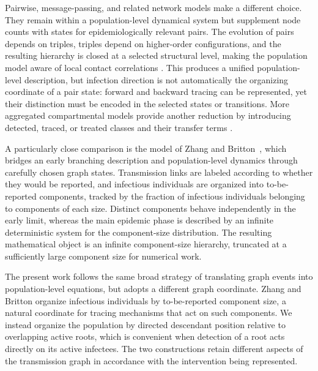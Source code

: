 \documentclass[review,12pt]{elsarticle}
\numberwithin{equation}{section}
\theoremstyle{remark}
\begin{document}
Pairwise, message-passing, and related network models make a different choice. They remain within a population-level dynamical system but supplement node counts with states for epidemiologically relevant pairs. The evolution of pairs depends on triples, triples depend on higher-order configurations, and the resulting hierarchy is closed at a selected structural level, making the population model aware of local contact correlations \cite{eames2003,house2010,karrer2010,sharkey2015a,sharkey2015b,pellis2015,wilkinson2017}. This produces a unified population-level description, but infection direction is not automatically the organizing coordinate of a pair state: forward and backward tracing can be represented, yet their distinction must be encoded in the selected states or transitions. More aggregated compartmental models provide another reduction by introducing detected, traced, or treated classes and their transfer terms \cite{hethcote1984,dearazoza2002,hyman2003,hsieh2010}.

A particularly close comparison is the model of Zhang and Britton~\cite{zhang2022}, which bridges an early branching description and population-level dynamics through carefully chosen graph states. Transmission links are labeled according to whether they would be reported, and infectious individuals are organized into to-be-reported components, tracked by the fraction of infectious individuals belonging to components of each size. Distinct components behave independently in the early limit, whereas the main epidemic phase is described by an infinite deterministic system for the component-size distribution. The resulting mathematical object is an infinite component-size hierarchy, truncated at a sufficiently large component size for numerical work.

The present work follows the same broad strategy of translating graph events into population-level equations, but adopts a different graph coordinate. Zhang and Britton organize infectious individuals by to-be-reported component size, a natural coordinate for tracing mechanisms that act on such components. We instead organize the population by directed descendant position relative to overlapping active roots, which is convenient when detection of a root acts directly on its active infectees. The two constructions retain different aspects of the transmission graph in accordance with the intervention being represented.
\end{document}
